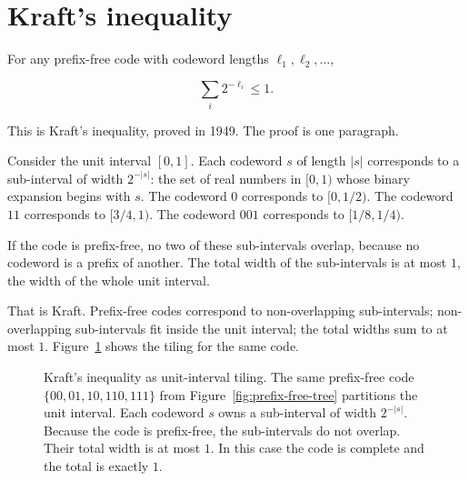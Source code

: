 \section*{Kraft's inequality}

For any prefix-free code with codeword lengths $\ell_1, \ell_2, \ldots$,

$$\sum_i 2^{-\ell_i} \leq 1.$$

This is Kraft's inequality, proved in 1949. The proof is one paragraph.

Consider the unit interval $[0, 1]$. Each codeword $s$ of length $|s|$ corresponds to a sub-interval of width $2^{-|s|}$: the set of real numbers in $[0,1)$ whose binary expansion begins with $s$. The codeword $0$ corresponds to $[0, 1/2)$. The codeword $11$ corresponds to $[3/4, 1)$. The codeword $001$ corresponds to $[1/8, 1/4)$.

If the code is prefix-free, no two of these sub-intervals overlap, because no codeword is a prefix of another. The total width of the sub-intervals is at most $1$, the width of the whole unit interval.

That is Kraft. Prefix-free codes correspond to non-overlapping sub-intervals; non-overlapping sub-intervals fit inside the unit interval; the total widths sum to at most $1$. Figure~\ref{fig:kraft-interval} shows the tiling for the same code.

\begin{figure}[h]
\centering
{}
\caption{Kraft's inequality as unit-interval tiling. The same prefix-free code $\{00, 01, 10, 110, 111\}$ from Figure~\ref{fig:prefix-free-tree} partitions the unit interval. Each codeword $s$ owns a sub-interval of width $2^{-|s|}$. Because the code is prefix-free, the sub-intervals do not overlap. Their total width is at most $1$. In this case the code is complete and the total is exactly $1$.}
\label{fig:kraft-interval}
\end{figure}

